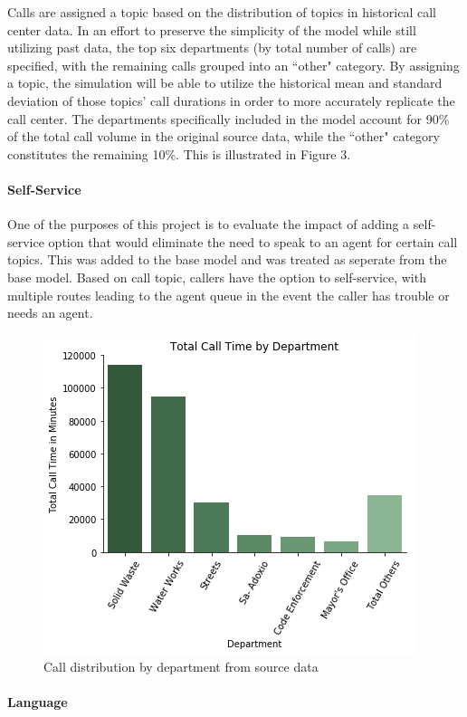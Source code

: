 \documentclass[12pt,twocolumn]{article}
\begin{document}
Calls are assigned a topic based on the distribution of topics in historical call center data.  In an effort to preserve the simplicity of the model while still utilizing past data, the top six departments (by total number of calls) are specified, with the remaining calls grouped into an ``other" category.  By assigning a topic, the simulation will be able to utilize the historical mean and standard deviation of those topics' call durations in order to more accurately replicate the call center.  The departments specifically included in the model account for 90\% of the total call volume in the original source data, while the ``other" category constitutes the remaining 10\%.  This is illustrated in Figure 3.

	\paragraph{Self-Service}
	
One of the purposes of this project is to evaluate the impact of adding a self-service option that would eliminate the need to speak to an agent for certain call topics.  This was added to the base model and was treated as seperate from the base model.  Based on call topic, callers have the option to self-service, with multiple routes leading to the agent queue in the event the caller has trouble or needs an agent.


\begin{figure}[h]
	\includegraphics[scale=.53]{Calls_Department_sim.png}
	\caption{Call distribution by department from source data}
\end{figure}

	\paragraph{Language}
\end{document}
